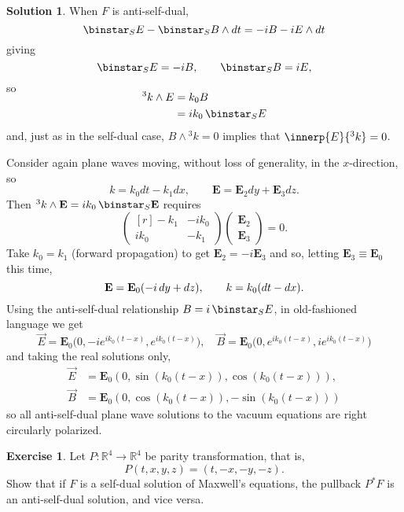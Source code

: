 \documentclass[11pt, a4paper]{report}
\theoremstyle{definition}
\newtheorem{exercise}{Exercise}[part]
\newtheorem{solution}{Solution}[part]
\newenvironment{ex}{\begin{exercise}}{\end{exercise}\pagebreak[1]}
\newenvironment{sol}{\begin{solution}}{\end{solution}\pagebreak[3]}
\newcommand*{\op}[1]{\ensuremath\mathop{}\mathopen{}#1}
\renewcommand*{\d}{\op{d}}
\renewcommand*{\star}{\op{\binstar}\mathord{}}
\begin{document}
\begin{sol}
When $F$ is anti-self-dual,
\[
    \star_S E - \star_S B \wedge dt = -iB - iE \wedge dt
\]
giving
\[
    \star_S E = -i B, \qquad
    \star_S B = iE,
\]
so
\begin{align*}
    \SwapAboveDisplaySkip
    ^3k \wedge E &= k_0 B \\
                 &= ik_0 \star_S E
\end{align*}
and, just as in the self-dual case, $B \wedge {}^3 k = 0$ implies that $\innerp{E}{{}^3 k} = 0$.

Consider again plane waves moving, without loss of generality, in the $x$-direction, so
\[
    k = k_0 dt - k_1 dx, \qquad
    \mathbf{E} = \mathbf{E}_2 dy + \mathbf{E}_3 dz.
\]
Then $^3k \wedge \mathbf{E} = ik_0 \star_S \mathbf{E}$ requires
\[
    \begin{pmatrix*}[r]
        -k_1  & -ik_0 \\
        ik_0 & -k_1
    \end{pmatrix*}
    \begin{pmatrix}
        \mathbf{E}_2 \\ \mathbf{E}_3
    \end{pmatrix}
    = 0.
\]
Take $k_0 = k_1$ (forward propagation) to get $\mathbf{E}_2 = -i \mathbf{E}_3$ and so, letting $\mathbf{E}_3 \equiv \mathbf{E}_0$ this time,
\[
    \mathbf{E} = \mathbf{E}_0 (-i \d y + dz), \qquad
    k = k_0 (dt - dx).
\]
Using the anti-self-dual relationship $B = i \star_S E$, in old-fashioned language we get
\[
    \vec{E} = \mathbf{E}_0 \bigl( 0, -ie^{ik_0 (t - x)}, e^{ik_0 (t - x)} \bigr), \quad
    \vec{B} = \mathbf{E}_0 \bigl( 0, e^{ik_0 (t - x)}, ie^{ik_0 (t - x)} \bigr)
\]
and taking the real solutions only,
\begin{align*}
    \vec{E} &= \mathbf{E}_0 (0, \sin(k_0 (t - x)), \cos(k_0 (t - x))), \\
    \vec{B} &= \mathbf{E}_0 (0, \cos(k_0 (t - x)), -\sin(k_0 (t - x)))
\end{align*}
so all anti-self-dual plane wave solutions to the vacuum equations are right circularly polarized.

\end{sol}

\begin{ex}

Let $P: \mathbb{R}^4 \to \mathbb{R}^4$ be parity transformation, that is,
\[
    P(t, x, y, z) = (t, -x, -y, -z).
\]
Show that if $F$ is a self-dual solution of Maxwell's equations, the pullback $P^* F$ is an anti-self-dual solution, and vice versa.

\end{ex}
\end{document}
